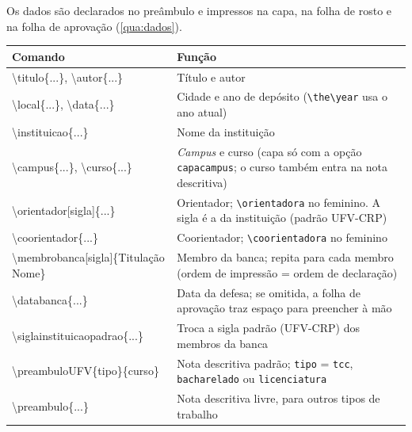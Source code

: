 Os dados são declarados no preâmbulo e impressos na capa, na folha de rosto e na folha
de aprovação (\autoref{qua:dados}).

\begin{quadro}[htbp]
\begin{ilustracao}{\caption{Comandos de dados do trabalho}\label{qua:dados}}{\elaboracaopropria}
  \renewcommand{\arraystretch}{1.2}
  \small
  \begin{tabularx}{\textwidth}{|>{\ttfamily\raggedright\arraybackslash}p{6.4cm}|X|}
    \hline
    \textnormal{\textbf{Comando}} & \textbf{Função} \\
    \hline
    \textbackslash titulo\{...\}, \textbackslash autor\{...\} & Título e autor \\
    \hline
    \textbackslash local\{...\}, \textbackslash data\{...\} & Cidade e ano de depósito (\texttt{\textbackslash the\textbackslash year} usa o ano atual) \\
    \hline
    \textbackslash instituicao\{...\} & Nome da instituição \\
    \hline
    \textbackslash campus\{...\}, \textbackslash curso\{...\} & \emph{Campus} e curso (capa só com a opção \texttt{capacampus}; o curso também entra na nota descritiva) \\
    \hline
    \textbackslash orientador[sigla]\{...\} & Orientador; \texttt{\textbackslash orientadora} no feminino. A sigla é a da instituição (padrão UFV-CRP) \\
    \hline
    \textbackslash coorientador\{...\} & Coorientador; \texttt{\textbackslash coorientadora} no feminino \\
    \hline
    \textbackslash membrobanca[sigla]\{Titulação Nome\} & Membro da banca; repita para cada membro (ordem de impressão = ordem de declaração) \\
    \hline
    \textbackslash databanca\{...\} & Data da defesa; se omitida, a folha de aprovação traz espaço para preencher à mão \\
    \hline
    \textbackslash siglainstituicaopadrao\{...\} & Troca a sigla padrão (UFV-CRP) dos membros da banca \\
    \hline
    \textbackslash preambuloUFV\{tipo\}\{curso\} & Nota descritiva padrão; \texttt{tipo} = \texttt{tcc}, \texttt{bacharelado} ou \texttt{licenciatura} \\
    \hline
    \textbackslash preambulo\{...\} & Nota descritiva livre, para outros tipos de trabalho \\
    \hline
  \end{tabularx}
\end{ilustracao}
\end{quadro}

